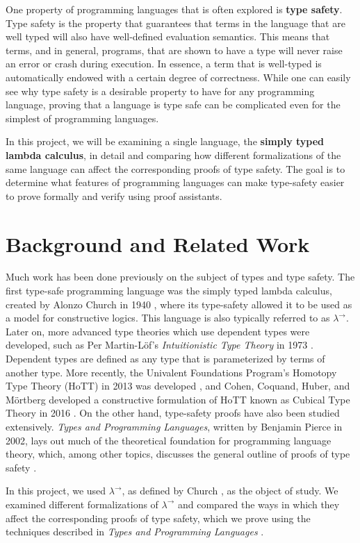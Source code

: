 \documentclass[12pt, letterpaper]{article}
\begin{document}
One property of programming languages that is often explored is \textbf{type safety}. Type safety is the property that guarantees that terms in the language that are well typed will also have well-defined evaluation semantics. This means that terms, and in general, programs, that are shown to have a type will never raise an error or crash during execution. In essence, a term that is well-typed is automatically endowed with a certain degree of correctness. While one can easily see why type safety is a desirable property to have for any programming language, proving that a language is type safe can be complicated even for the simplest of programming languages.

In this project, we will be examining a single language, the \textbf{simply typed lambda calculus}, in detail and comparing how different formalizations of the same language can affect the corresponding proofs of type safety. The goal is to determine what features of programming languages can make type-safety easier to prove formally and verify using proof assistants.

\section{Background and Related Work}
Much work has been done previously on the subject of types and type safety. The first type-safe programming language was the simply typed lambda calculus, created by Alonzo Church in 1940 \cite{church_1940}, where its type-safety allowed it to be used as a model for constructive logics. This language is also typically referred to as $\lambda^{\to}$. Later on, more advanced type theories which use dependent types were developed, such as Per Martin-L\"{o}f's \textit{Intuitionistic Type Theory} in 1973 \cite{martinlof}. Dependent types are defined as any type that is parameterized by terms of another type. More recently, the Univalent Foundations Program's Homotopy Type Theory (HoTT) in 2013 was developed \cite{hottbook}, and Cohen, Coquand, Huber, and M\"{o}rtberg developed a constructive formulation of HoTT known as Cubical Type Theory in 2016 \cite{cchm}. On the other hand, type-safety proofs have also been studied extensively. \textit{Types and Programming Languages}, written by Benjamin Pierce in 2002, lays out much of the theoretical foundation for programming language theory, which, among other topics, discusses the general outline of proofs of type safety \cite{tapl}.

In this project, we used $\lambda^{\to}$, as defined by Church \cite{church_1940}, as the object of study. We examined different formalizations of $\lambda^{\to}$ and compared the ways in which they affect the corresponding proofs of type safety, which we prove using the techniques described in \textit{Types and Programming Languages} \cite{tapl}.
\end{document}
